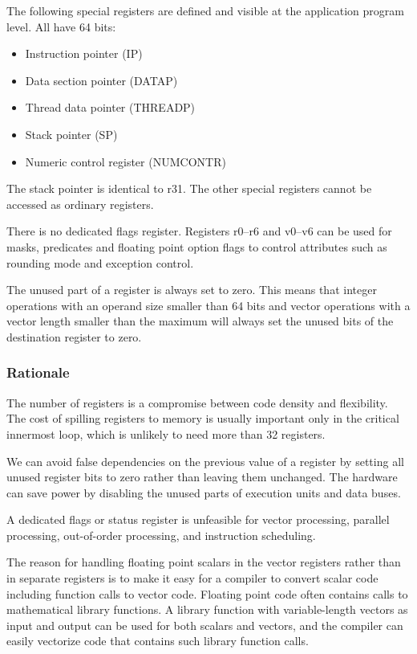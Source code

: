 \documentclass[forwardcom.tex]{subfiles}
\begin{document}
The following special registers are defined and visible at the application program level. All have 64 bits:

\begin{itemize}
\item Instruction pointer (IP)
\item Data section pointer (DATAP)
\item Thread data pointer (THREADP)
\item Stack pointer (SP)
\item Numeric control register (NUMCONTR)
\end{itemize}

The stack pointer is identical to r31. The other special registers cannot be accessed as ordinary registers.
\vv

There is no dedicated flags register. Registers r0--r6 and v0--v6 can be used for masks, predicates and floating point option flags to control attributes such as rounding mode and exception control.
\vv

The unused part of a register is always set to zero. This means that integer operations with an operand size smaller than 64 bits and vector operations with a vector length smaller than the maximum will always set the unused bits of the destination register to zero.

\subsubsection{Rationale}
The number of registers is a compromise between code density and flexibility. The cost of spilling registers to memory is usually important only in the critical innermost loop, which is unlikely to need more than 32 registers.
\vv

We can avoid false dependencies on the previous value of a register by setting all unused register bits to zero rather than leaving them unchanged. The hardware can save power by disabling the unused parts of execution units and data buses.
\vv

A dedicated flags or status register is unfeasible for vector processing, parallel processing, out-of-order processing, and instruction scheduling.
\vv

The reason for handling floating point scalars in the vector registers rather than in separate registers is to make it easy for a compiler to convert scalar code including function calls to vector code. Floating point code often contains calls to mathematical library functions. 
A library function with variable-length vectors as input and output can be used for both scalars and vectors, and the compiler can easily vectorize code that contains such library function calls.
\end{document}

